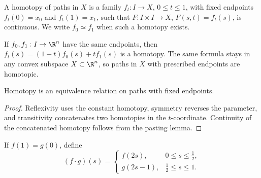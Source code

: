 \begin{definition}
\label{def:homotopy-of-paths}



A homotopy of paths in $X$ is a family $f_t:I\to X$, $0\leq t\leq1$, with fixed
endpoints $f_t(0)=x_0$ and $f_t(1)=x_1$, such that
$F:I\times I\to X$, $F(s,t)=f_t(s)$, is continuous. We write $f_0\simeq f_1$
when such a homotopy exists.
\end{definition}

\begin{example}
\label{ex:linear-homotopies-convex}



If $f_0,f_1:I\to\R^n$ have the same endpoints, then
$f_t(s)=(1-t)f_0(s)+tf_1(s)$ is a homotopy. The same formula stays in any
convex subspace $X\subset\R^n$, so paths in $X$ with prescribed endpoints are
homotopic.
\end{example}

\begin{proposition}
\label{prop:homotopy-paths-equivalence-relation}



Homotopy is an equivalence relation on paths with fixed endpoints.
\end{proposition}

\begin{proof}
\sketch Reflexivity uses the constant homotopy, symmetry reverses the parameter,
and transitivity concatenates two homotopies in the $t$-coordinate. Continuity
of the concatenated homotopy follows from the pasting lemma.
\end{proof}

\begin{definition}
\label{def:path-composition}



If $f(1)=g(0)$, define
\[
(f\cdot g)(s)=\begin{cases}f(2s),&0\leq s\leq\frac12,\\
g(2s-1),&\frac12\leq s\leq1.
\end{cases}
\]
\end{definition}

